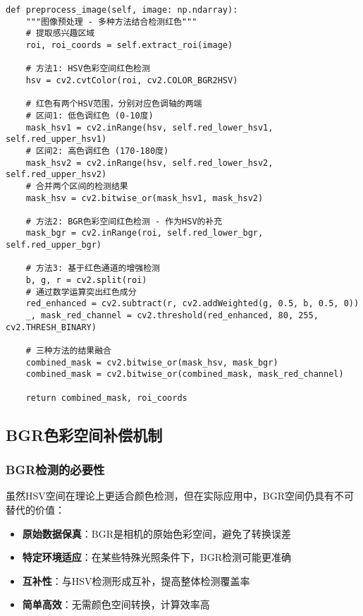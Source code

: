 \documentclass[12pt]{article}
\begin{document}
\begin{lstlisting}[caption=HSV双区间红色检测实现]
def preprocess_image(self, image: np.ndarray):
    """图像预处理 - 多种方法结合检测红色"""
    # 提取感兴趣区域
    roi, roi_coords = self.extract_roi(image)
    
    # 方法1: HSV色彩空间红色检测
    hsv = cv2.cvtColor(roi, cv2.COLOR_BGR2HSV)
    
    # 红色有两个HSV范围，分别对应色调轴的两端
    # 区间1: 低色调红色 (0-10度)
    mask_hsv1 = cv2.inRange(hsv, self.red_lower_hsv1, self.red_upper_hsv1)
    # 区间2: 高色调红色 (170-180度)
    mask_hsv2 = cv2.inRange(hsv, self.red_lower_hsv2, self.red_upper_hsv2)
    # 合并两个区间的检测结果
    mask_hsv = cv2.bitwise_or(mask_hsv1, mask_hsv2)
    
    # 方法2: BGR色彩空间红色检测 - 作为HSV的补充
    mask_bgr = cv2.inRange(roi, self.red_lower_bgr, self.red_upper_bgr)
    
    # 方法3: 基于红色通道的增强检测
    b, g, r = cv2.split(roi)
    # 通过数学运算突出红色成分
    red_enhanced = cv2.subtract(r, cv2.addWeighted(g, 0.5, b, 0.5, 0))
    _, mask_red_channel = cv2.threshold(red_enhanced, 80, 255, cv2.THRESH_BINARY)
    
    # 三种方法的结果融合
    combined_mask = cv2.bitwise_or(mask_hsv, mask_bgr)
    combined_mask = cv2.bitwise_or(combined_mask, mask_red_channel)
    
    return combined_mask, roi_coords
\end{lstlisting}

\subsection{BGR色彩空间补偿机制}

\subsubsection{BGR检测的必要性}

虽然HSV空间在理论上更适合颜色检测，但在实际应用中，BGR空间仍具有不可替代的价值：

\begin{itemize}
    \item \textbf{原始数据保真}：BGR是相机的原始色彩空间，避免了转换误差
    \item \textbf{特定环境适应}：在某些特殊光照条件下，BGR检测可能更准确
    \item \textbf{互补性}：与HSV检测形成互补，提高整体检测覆盖率
    \item \textbf{简单高效}：无需颜色空间转换，计算效率高
\end{itemize}
\end{document}
